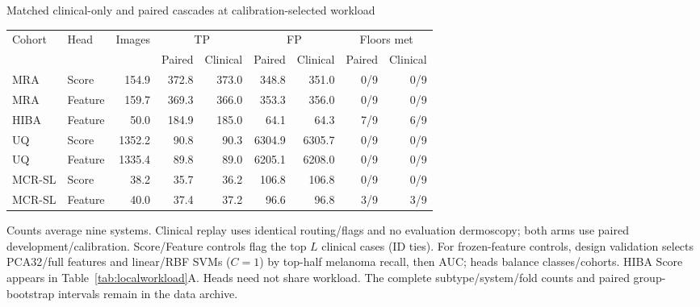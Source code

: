 \caption{Matched clinical-only and paired cascades at calibration-selected workload}\label{tab:matched}\centering
\small\renewcommand{\arraystretch}{1.00}\setlength{\tabcolsep}{3pt}
\begin{tabular*}{\textwidth}{@{\extracolsep{\fill}}llrrrrrrr@{}}\toprule
Cohort & Head & Images & \multicolumn{2}{c}{TP} & \multicolumn{2}{c}{FP} & \multicolumn{2}{c}{Floors met}\\
& & & Paired & Clinical & Paired & Clinical & Paired & Clinical\\\midrule
MRA & Score & 154.9 & 372.8 & 373.0 & 348.8 & 351.0 & 0/9 & 0/9\\
MRA & Feature & 159.7 & 369.3 & 366.0 & 353.3 & 356.0 & 0/9 & 0/9\\
HIBA & Feature & 50.0 & 184.9 & 185.0 & 64.1 & 64.3 & 7/9 & 6/9\\
UQ & Score & 1352.2 & 90.8 & 90.3 & 6304.9 & 6305.7 & 0/9 & 0/9\\
UQ & Feature & 1335.4 & 89.8 & 89.0 & 6205.1 & 6208.0 & 0/9 & 0/9\\
MCR-SL & Score & 38.2 & 35.7 & 36.2 & 106.8 & 106.8 & 0/9 & 0/9\\
MCR-SL & Feature & 40.0 & 37.4 & 37.2 & 96.6 & 96.8 & 3/9 & 3/9\\
\bottomrule\end{tabular*}\par\smallskip\parbox{\linewidth}{\footnotesize Counts average nine systems. Clinical replay uses identical routing/flags and no evaluation dermoscopy; both arms use paired development/calibration. Score/Feature controls flag the top $L$ clinical cases (ID ties). For frozen-feature controls, design validation selects PCA32/full features and linear/RBF SVMs ($C=1$) by top-half melanoma recall, then AUC; heads balance classes/cohorts. HIBA Score appears in Table~\ref{tab:localworkload}A. Heads need not share workload. The complete subtype/system/fold counts and paired group-bootstrap intervals remain in the data archive.}

